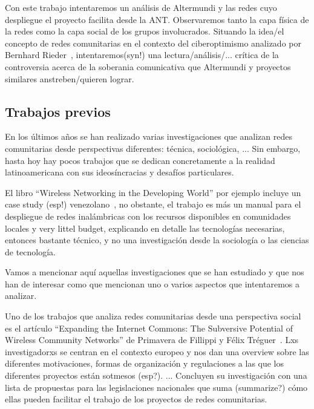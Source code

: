 

Con este trabajo intentaremos un análisis de Altermundi y las redes cuyo despliegue el proyecto facilita desde la ANT.
Observaremos tanto la capa física de la redes como la capa social de los grupos involucrados.
Situando la idea/el concepto de redes comunitarias en el contexto del ciberoptimismo analizado por Bernhard Rieder~\autocite{Rieder2012}, intentaremos(syn!) una lectura/análisis/... crítica de la controversia acerca de la soberania comunicativa que Altermundi y proyectos similares anstreben/quieren lograr.

\subsection{Trabajos previos}

En los últimos años se han realizado varias investigaciones que analizan redes comunitarias desde perspectivas diferentes: técnica, sociológica, ...
Sin embargo, hasta hoy hay pocos trabajos que se dedican concretamente a la realidad latinoamericana con sus ideosíncracias y desafíos particulares.

El libro ``Wireless Networking in the Developing World'' por ejemplo incluye un case study (esp!) venezolano~\autocite[437-452]{WNDW2013}, no obstante, el trabajo es más un manual para el despliegue de redes inalámbricas con los recursos disponibles en comunidades locales y very littel budget, explicando en detalle las tecnologías necesarias, entonces bastante técnico, y no una investigación desde la sociología o las ciencias de tecnología.

Vamos a mencionar aquí aquellas investigaciones que se han estudiado y que nos han de interesar como que mencionan uno o varios aspectos que intentaremos a analizar.

Uno de los trabajos que analiza redes comunitarias desde una perspectiva social es el artículo ``Expanding the Internet Commons: The Subversive Potential of Wireless Community Networks'' de Primavera de Fillippi y Félix Tréguer~\autocite{FiTre2015}.
Lxs investigadorxs se centran en el contexto europeo y nos dan una overview sobre las diferentes motivaciones, formas de organización y regulaciones a las que los diferentes proyectos están sotmesos (esp?).
...
Concluyen su investigación con una lista de propuestas para las legislaciones nacionales que suma (summarize?) cómo ellas pueden facilitar el trabajo de los proyectos de redes comunitarias.


